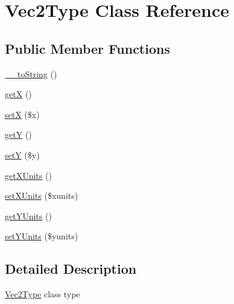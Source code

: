 \hypertarget{classVec2Type}{
\section{Vec2Type Class Reference}
\label{d8/dd4/classVec2Type}
}
\subsection*{Public Member Functions}
\begin{DoxyCompactItemize}
\item 
\hyperlink{classVec2Type_a496f10b50b6682db821d25f30aa08062}{\_\-\_\-toString} ()
\item 
\hyperlink{classVec2Type_abbb1405041be6fd0d2b45e6fbaf3c050}{getX} ()
\item 
\hyperlink{classVec2Type_a019f83f4539c5d47e368718b7fe97176}{setX} (\$x)
\item 
\hyperlink{classVec2Type_a4997aeadb8f6d9ed0749028f97662123}{getY} ()
\item 
\hyperlink{classVec2Type_ad6bc0edbf5a62719844a82fa3fffbcdd}{setY} (\$y)
\item 
\hyperlink{classVec2Type_a192a663a7350a7600a79afc676be5634}{getXUnits} ()
\item 
\hyperlink{classVec2Type_a91e48906dd84a9a7bf584b0c3e1d6b1a}{setXUnits} (\$xunits)
\item 
\hyperlink{classVec2Type_a9620cfb22f11fa96f1807ffa7c253568}{getYUnits} ()
\item 
\hyperlink{classVec2Type_acae61072f97a6e3e4fd74ebaa15d74cf}{setYUnits} (\$yunits)
\end{DoxyCompactItemize}


\subsection{Detailed Description}
\hyperlink{classVec2Type}{Vec2Type} class type 


